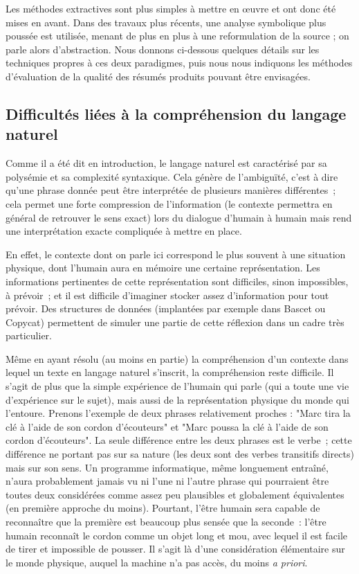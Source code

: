 \documentclass[a4paper, 12pt]{article}
\begin{document}
Les méthodes extractives sont plus simples à mettre en \oe{}uvre et ont donc été mises en avant. Dans des travaux plus récents, une analyse symbolique plus poussée est utilisée, menant de plus en plus à une reformulation de la source ; on parle alors d'abstraction. Nous donnons ci-dessous quelques détails sur les techniques propres à ces deux paradigmes, puis nous nous indiquons les méthodes d'évaluation de la qualité des résumés produits pouvant être envisagées.

\subsection{Difficultés liées à la compréhension du langage naturel}

Comme il a été dit en introduction, le langage naturel est caractérisé par sa polysémie et sa complexité syntaxique. Cela génère de l'ambiguïté, c'est à dire qu'une phrase donnée peut être interprétée de plusieurs manières différentes~; cela permet une forte compression de l'information (le contexte permettra en général de retrouver le sens exact) lors du dialogue d'humain à humain mais rend une interprétation exacte compliquée à mettre en place.

En effet, le contexte dont on parle ici correspond le plus souvent à une situation physique, dont l'humain aura en mémoire une certaine représentation. Les informations pertinentes de cette représentation sont difficiles, sinon impossibles, à prévoir~; et il est difficile d'imaginer stocker assez d'information pour tout prévoir. Des structures de données (implantées par exemple dans Bascet ou Copycat) permettent de simuler une partie de cette réflexion dans un cadre très particulier.

Même en ayant résolu (au moins en partie) la compréhension d'un contexte dans lequel un texte en langage naturel s'inscrit, la compréhension reste difficile. Il s'agit de plus que la simple expérience de l'humain qui parle (qui a toute une vie d'expérience sur le sujet), mais aussi de la représentation physique du monde qui l'entoure. Prenons l'exemple de deux phrases relativement proches : "Marc tira la clé à l'aide de son cordon d'écouteurs" et "Marc poussa la clé à l'aide de son cordon d'écouteurs". La seule différence entre les deux phrases est le verbe~; cette différence ne portant pas sur sa nature (les deux sont des verbes transitifs directs) mais sur son sens. Un programme informatique, même longuement entraîné, n'aura probablement jamais vu ni l'une ni l'autre phrase qui pourraient être toutes deux considérées comme assez peu plausibles et globalement équivalentes (en première approche du moins). Pourtant, l'être humain sera capable de reconnaître que la première est beaucoup plus sensée que la seconde~: l'être humain reconnaît le cordon comme un objet long et mou, avec lequel il est facile de tirer et impossible de pousser. Il s'agit là d'une considération élémentaire sur le monde physique, auquel la machine n'a pas accès, du moins \emph{a priori}.
\end{document}
